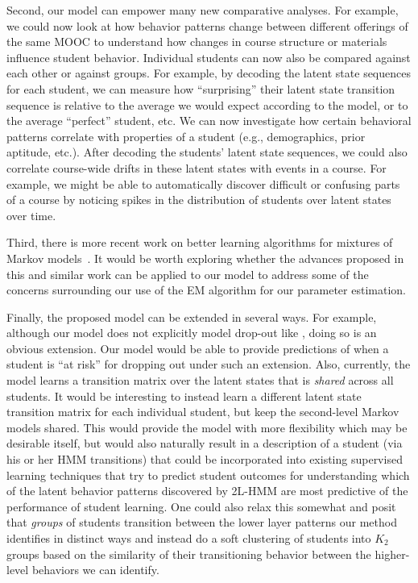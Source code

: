 Second, our model can empower many new comparative analyses. For example, we could
now look at how behavior patterns change between different offerings of
the same MOOC to understand how changes in course structure or materials
influence student behavior. Individual students can now also be compared
against each other or against groups. For example, by decoding the latent
state sequences for each student, we can measure how ``surprising'' their
latent state transition sequence is relative to the average we would expect
according to the model, or to the average ``perfect'' student, etc. We can
now investigate how certain behavioral patterns correlate with properties
of a student (e.g., demographics, prior aptitude, etc.). After decoding the
students' latent state sequences, we could also correlate course-wide
drifts in these latent states with events in a course. For example, we
might be able to automatically discover difficult or confusing parts of a
course by noticing spikes in the distribution of students over latent
states over time.

Third, there is more recent work on better learning algorithms for mixtures of
Markov models~\citep{Gupta:2016:NIPS}. It would be worth exploring whether
the advances proposed in this and similar work can be applied to our model
to address some of the concerns surrounding our use of the EM algorithm for
our parameter estimation.

Finally, the proposed model can be extended in several ways. For example, 
although our model does not explicitly model drop-out like
\citet{Kizilcec:2013:LAK}, doing so is an obvious extension. Our model
would be able to provide predictions of when a student is ``at risk'' for
dropping out under such an extension.
Also, currently, the model learns a transition matrix over the latent states that
is \emph{shared} across all students. It would be interesting to instead
learn a different latent state transition matrix for each individual
student, but keep the second-level Markov models shared. This would provide
the model with more flexibility which may be desirable itself, but would
also naturally result in a description of a student (via his or her HMM
transitions) that could be incorporated into existing supervised learning
techniques that try to predict student outcomes for understanding
which of the latent behavior patterns discovered by 2L-HMM are most predictive
of the performance of student learning. One could also relax this somewhat
and posit that \emph{groups} of students transition between the lower layer
patterns our method identifies in distinct ways and instead do a soft
clustering of students into $K_2$ groups based on the similarity of their
transitioning behavior between the higher-level behaviors we can identify.



